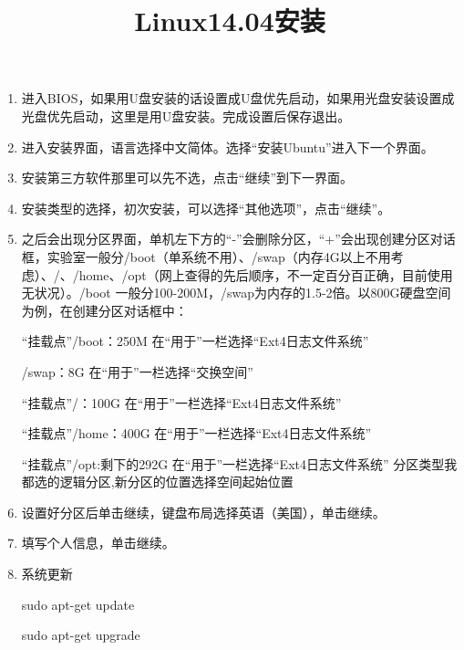 \documentclass[a4paper,12pt]{article}
\title{Linux14.04安装}
\begin{document}
\maketitle
\begin{enumerate}
\item 进入BIOS，如果用U盘安装的话设置成U盘优先启动，如果用光盘安装设置成光盘优先启动，这里是用U盘安装。完成设置后保存退出。

\item 进入安装界面，语言选择中文简体。选择“安装Ubuntu”进入下一个界面。

\item 安装第三方软件那里可以先不选，点击“继续”到下一界面。

\item 安装类型的选择，初次安装，可以选择“其他选项”，点击“继续”。

\item 之后会出现分区界面，单机左下方的“-”会删除分区，“+”会出现创建分区对话框，实验室一般分/boot（单系统不用）、/swap（内存4G以上不用考虑）、/、/home、/opt（网上查得的先后顺序，不一定百分百正确，目前使用无状况）。/boot 一般分100-200M，/swap为内存的1.5-2倍。以800G硬盘空间为例，在创建分区对话框中：

“挂载点”/boot：250M \qquad 在“用于”一栏选择“Ext4日志文件系统”

/swap：8G \qquad 在“用于”一栏选择“交换空间”

“挂载点”/：100G \qquad 在“用于”一栏选择“Ext4日志文件系统”

“挂载点”/home：400G \qquad 在“用于”一栏选择“Ext4日志文件系统”

“挂载点”/opt:剩下的292G \qquad 在“用于”一栏选择“Ext4日志文件系统”
分区类型我都选的逻辑分区,新分区的位置选择空间起始位置
\item 设置好分区后单击继续，键盘布局选择英语（美国），单击继续。

\item 填写个人信息，单击继续。

\item 系统更新

sudo apt-get update

sudo apt-get upgrade


\end{enumerate}
\end{document}
